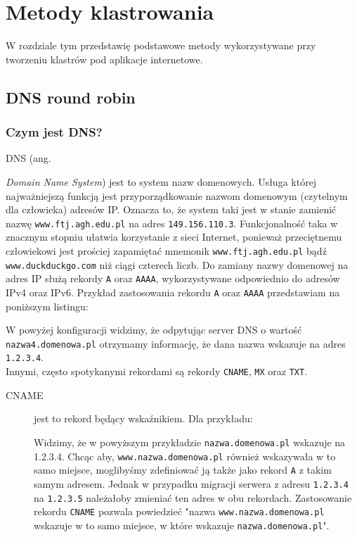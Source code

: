 \chapter{Metody klastrowania}
W rozdziale tym przedstawię podstawowe metody wykorzystywane przy tworzeniu klastrów pod aplikacje internetowe.
\section{DNS round robin}
\label{sec:dns}
\subsection{Czym jest DNS?}
DNS (ang. {\textit{Domain Name System}) jest to system nazw domenowych. Usługa której najważniejszą funkcją jest przyporządkowanie nazwom domenowym (czytelnym dla człowieka) adresów IP.
Oznacza to, że system taki jest w stanie zamienić nazwę \texttt{www.ftj.agh.edu.pl} na adres \texttt{149.156.110.3}.
Funkcjonalność taka w znacznym stopniu ułatwia korzystanie z sieci Internet, ponieważ przeciętnemu człowiekowi jest prościej zapamiętać mnemonik \texttt{www.ftj.agh.edu.pl} bądź \texttt{www.duckduckgo.com} niż ciągi czterech liczb.
Do zamiany nazwy domenowej na adres IP służą rekordy \texttt{A} oraz \texttt{AAAA}, wykorzystywane odpowiednio do adresów IPv4 oraz IPv6.
Przykład zastosowania rekordu \texttt{A} oraz \texttt{AAAA} przedstawiam na poniższym listingu:

W powyżej konfiguracji widzimy, że odpytując server DNS o wartość \texttt{nazwa4.domenowa.pl} otrzymamy informację, że dana nazwa wskazuje na adres \texttt{1.2.3.4}.\\
Innymi, często spotykanymi rekordami są rekordy \texttt{CNAME}, \texttt{MX} oraz \texttt{TXT}.
\begin{description}
\item[CNAME] jest to rekord będący wskaźnikiem. Dla przykładu:

Widzimy, że w powyższym przykładzie \texttt{nazwa.domenowa.pl} wskazuje na 1.2.3.4.
Chcąc aby, \texttt{www.nazwa.domenowa.pl} również wskazywała w to samo miejsce, moglibyśmy zdefiniować ją także jako rekord \texttt{A} z takim samym adresem.
Jednak w przypadku migracji serwera z adresu \texttt{1.2.3.4} na \texttt{1.2.3.5} należałoby zmieniać ten adres w obu rekordach.
Zastosowanie rekordu \texttt{CNAME} pozwala powiedzieć "nazwa \texttt{www.nazwa.domenowa.pl} wskazuje w to samo miejsce, w które wskazuje \texttt{nazwa.domenowa.pl}".

\end{description}}
